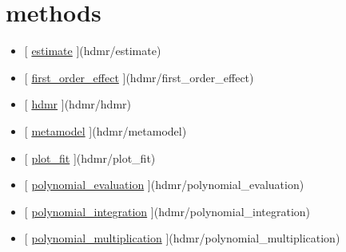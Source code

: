 \documentclass[letterpaper,10pt,english]{sphinxmanual}
\begin{document}
\section{methods}
\label{classes/utils/@hdmr/hdmr:methods}\begin{itemize}
\item {} 
{[} {\hyperref[classes/utils/@hdmr/hdmr:estimate]{estimate}} {]}(hdmr/estimate)

\item {} 
{[} {\hyperref[classes/utils/@hdmr/hdmr:first-order-effect]{first\_order\_effect}} {]}(hdmr/first\_order\_effect)

\item {} 
{[} {\hyperref[classes/utils/@hdmr/hdmr:hdmr]{hdmr}} {]}(hdmr/hdmr)

\item {} 
{[} {\hyperref[classes/utils/@hdmr/hdmr:metamodel]{metamodel}} {]}(hdmr/metamodel)

\item {} 
{[} {\hyperref[classes/utils/@hdmr/hdmr:plot-fit]{plot\_fit}} {]}(hdmr/plot\_fit)

\item {} 
{[} {\hyperref[classes/utils/@hdmr/hdmr:polynomial-evaluation]{polynomial\_evaluation}} {]}(hdmr/polynomial\_evaluation)

\item {} 
{[} {\hyperref[classes/utils/@hdmr/hdmr:polynomial-integration]{polynomial\_integration}} {]}(hdmr/polynomial\_integration)

\item {} 
{[} {\hyperref[classes/utils/@hdmr/hdmr:polynomial-multiplication]{polynomial\_multiplication}} {]}(hdmr/polynomial\_multiplication)

\end{itemize}
\end{document}
